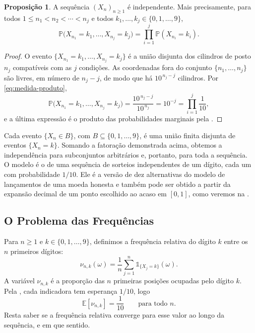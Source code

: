 \documentclass[12pt,portuguese]{article}
\theoremstyle{definition}
\newtheorem{proposition}[proposition]{Proposição}
\theoremstyle{plainexercise}
\theoremstyle{starredexercise}
\theoremstyle{definition}
\begin{document}
\begin{proposition}\label{prop:independencia}
A sequência $(X_n)_{n\geqslant1}$ é independente. Mais precisamente, para todos
$1\leqslant n_1<n_2<\cdots<n_j$ e todos
$k_1,\ldots,k_j\in\{0,1,\ldots,9\}$,
\[
\mathbb{P}\bigl(X_{n_1}=k_1,\ldots,X_{n_j}=k_j\bigr)
=
\prod_{i=1}^{j}\mathbb{P}(X_{n_i}=k_i).
\]
\end{proposition}

\begin{proof}
O evento $\{X_{n_1}=k_1,\ldots,X_{n_j}=k_j\}$ é a união disjunta dos cilindros
de posto $n_j$ compatíveis com as $j$ condições. As coordenadas fora do conjunto
$\{n_1,\ldots,n_j\}$ são livres, em número de $n_j-j$, de modo que há
$10^{\,n_j-j}$ cilindros. Por \eqref{eq:medida-produto},
\[
\mathbb{P}\bigl(X_{n_1}=k_1,\ldots,X_{n_j}=k_j\bigr)
=
\frac{10^{\,n_j-j}}{10^{\,n_j}}
=
10^{-j}
=
\prod_{i=1}^{j}\frac{1}{10},
\]
e a última expressão é o produto das probabilidades marginais pela
.
\end{proof}

Cada evento $\{X_n\in B\}$, com $B\subseteq\{0,1,\ldots,9\}$, é uma união
finita disjunta de eventos $\{X_n=k\}$. Somando a fatoração demonstrada acima,
obtemos a independência para subconjuntos arbitrários e, portanto,
para toda a sequência. O modelo é o de uma sequência de sorteios independentes
de um dígito, cada um com probabilidade $1/10$. Ele é a versão de dez alternativas do
modelo de lançamentos de uma moeda honesta e também pode ser obtido a partir da
expansão decimal de um ponto escolhido ao acaso em $[0,1]$, como veremos na
.

\subsection{O Problema das Frequências}\label{subsec:problema-frequencias}

Para $n\geqslant1$ e $k\in\{0,1,\ldots,9\}$, definimos a frequência relativa do
dígito $k$ entre os $n$ primeiros dígitos:
\begin{equation}\label{eq:frequencia}
\nu_{n,k}(\omega)
=
\frac{1}{n}\sum_{j=1}^{n}\mathds{1}_{\{X_j=k\}}(\omega).
\end{equation}
A variável $\nu_{n,k}$ é a proporção das $n$ primeiras posições ocupadas pelo
dígito $k$. Pela , cada indicadora tem esperança
$1/10$, logo
\[
\mathbb{E}[\nu_{n,k}]=\frac{1}{10}
\qquad\text{para todo }n.
\]
Resta saber se a frequência relativa converge para esse valor ao longo da
sequência, e em que sentido.
\end{document}
